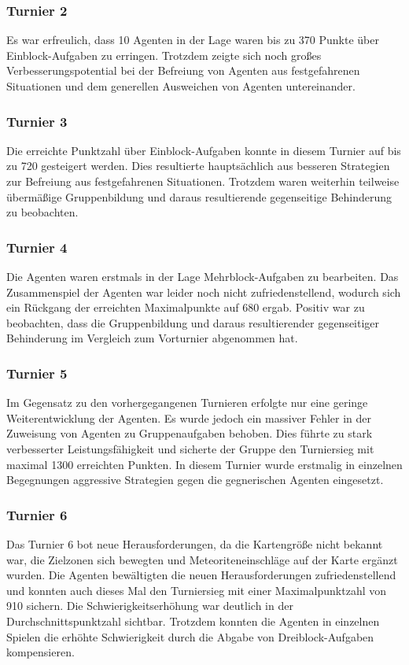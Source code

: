 \documentclass[runningheads]{llncs}
\begin{document}
	\subsubsection{Turnier 2}
	Es war erfreulich, dass 10 Agenten in der Lage waren bis zu 370 Punkte über Einblock-Aufgaben zu erringen. Trotzdem zeigte sich noch großes Verbesserungspotential bei der Befreiung von Agenten aus festgefahrenen Situationen und dem generellen Ausweichen von Agenten untereinander.
	
	\subsubsection{Turnier 3}
	Die erreichte Punktzahl über Einblock-Aufgaben konnte in diesem Turnier auf bis zu 720 gesteigert werden. Dies resultierte hauptsächlich aus besseren Strategien zur Befreiung aus festgefahrenen Situationen. Trotzdem waren weiterhin teilweise übermäßige Gruppenbildung und daraus resultierende gegenseitige Behinderung zu beobachten.
	
	\subsubsection{Turnier 4}
	Die Agenten waren erstmals in der Lage Mehrblock-Aufgaben zu bearbeiten. Das Zusammenspiel der Agenten war leider noch nicht zufriedenstellend, wodurch sich ein Rückgang der erreichten Maximalpunkte auf 680 ergab. Positiv war zu beobachten, dass die Gruppenbildung und daraus resultierender gegenseitiger Behinderung im Vergleich zum Vorturnier abgenommen hat.
	
	\subsubsection{Turnier 5}
	Im Gegensatz zu den vorhergegangenen Turnieren erfolgte nur eine geringe Weiterentwicklung der Agenten. Es wurde jedoch ein massiver Fehler in der Zuweisung von Agenten zu Gruppenaufgaben behoben. Dies führte zu stark verbesserter Leistungsfähigkeit und sicherte der Gruppe den Turniersieg mit maximal 1300 erreichten Punkten. In diesem Turnier wurde erstmalig in einzelnen Begegnungen aggressive Strategien gegen die gegnerischen Agenten eingesetzt.
	
	\subsubsection{Turnier 6}
	Das Turnier 6 bot neue Herausforderungen, da die Kartengröße nicht bekannt war, die Zielzonen sich bewegten und Meteoriteneinschläge auf der Karte ergänzt wurden. Die Agenten bewältigten die neuen Herausforderungen zufriedenstellend und konnten auch dieses Mal den Turniersieg mit einer Maximalpunktzahl von 910 sichern. Die Schwierigkeitserhöhung war deutlich in der Durchschnittspunktzahl sichtbar. Trotzdem konnten die Agenten in einzelnen Spielen die erhöhte Schwierigkeit durch die Abgabe von Dreiblock-Aufgaben kompensieren.
	
\end{document}
